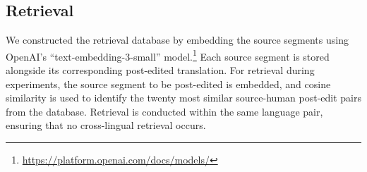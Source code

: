 \documentclass[11pt]{article}
\theoremstyle{plain}
\theoremstyle{definition}
\theoremstyle{remark}
\begin{document}
\subsection{Retrieval}
We constructed the retrieval database by embedding the source segments using OpenAI’s ``text-embedding-3-small'' model.\footnote{\url{https://platform.openai.com/docs/models/}} Each source segment is stored alongside its corresponding post-edited translation. For retrieval during experiments, the source segment to be post-edited is embedded, and cosine similarity is used to identify the twenty most similar source-human post-edit pairs from the database. Retrieval is conducted within the same language pair, ensuring that no cross-lingual retrieval occurs.


\begin{figure}[H]
\centering
\scriptsize
\end{figure}
\end{document}
